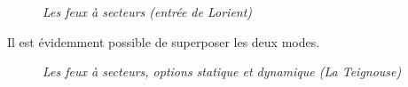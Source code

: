 \begin{center}
\begin{figure}[ht]
\caption{\label{equiProj}\textit{Les feux à secteurs (entrée de Lorient)}}
\end{figure}
\end{center}
Il est évidemment possible de superposer les deux modes.
\begin{center}
\begin{figure}[ht]
\caption{\label{equiProj}\textit{Les feux à secteurs, options statique et dynamique  (La Teignouse)}}
\end{figure}
\end{center}
